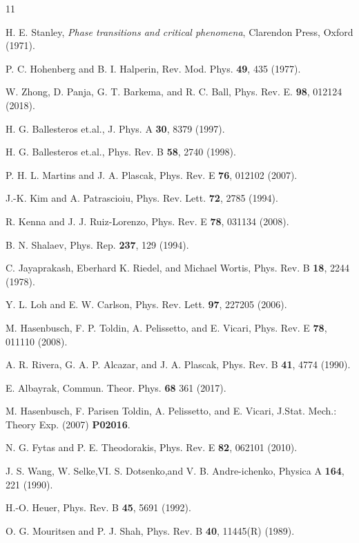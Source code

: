 \documentclass[12pt,nofootinbib,aps,amsmath,amssymb,preprint,showpacs]{revtex4}
\begin{document}
\begin{thebibliography}{11}

 H. E. Stanley, {\it Phase transitions and critical
  phenomena}, Clarendon Press, Oxford (1971).
  
 P. C. Hohenberg and B. I. Halperin,
  Rev. Mod. Phys. {\bf 49}, 435 (1977).

 W. Zhong, D. Panja, G. T. Barkema, and R. C. Ball,
  Phys. Rev. E. {\bf 98}, 012124 (2018).

 H. G. Ballesteros et.al., J. Phys. A {\bf 30}, 8379
  (1997).

 H. G. Ballesteros et.al., Phys. Rev. B {\bf 58}, 2740
  (1998).

 P. H. L. Martins and J. A. Plascak, Phys. Rev. E
  {\bf 76}, 012102 (2007).

 J.-K. Kim and A. Patrascioiu, Phys. Rev. Lett. {\bf 72},
  2785 (1994).

 R. Kenna and J. J. Ruiz-Lorenzo, Phys. Rev. E {\bf
  78}, 031134 (2008).

 B. N. Shalaev, Phys. Rep. {\bf 237}, 129 (1994).

 C. Jayaprakash, Eberhard K. Riedel, and Michael
  Wortis, Phys. Rev. B {\bf 18}, 2244 (1978).

 Y. L. Loh and E. W. Carlson, Phys. Rev. Lett. {\bf 97},
  227205 (2006).

 M. Hasenbusch, F. P. Toldin, A. Pelissetto, and
  E. Vicari, Phys. Rev. E {\bf 78}, 011110 (2008).

 A. R. Rivera, G. A. P. Alcazar, and J. A. Plascak,
  Phys. Rev. B {\bf 41}, 4774 (1990).

 E. Albayrak, Commun. Theor. Phys. {\bf 68} 361 (2017).

 M. Hasenbusch, F. Parisen Toldin, A. Pelissetto, and
  E. Vicari, J.Stat. Mech.: Theory Exp. (2007) {\bf P02016}.

 N. G. Fytas and P. E. Theodorakis, Phys. Rev. E {\bf
  82}, 062101 (2010).

 J. S. Wang, W. Selke,VI. S. Dotsenko,and
  V. B. Andre-ichenko, Physica A {\bf 164}, 221 (1990).

 H.-O. Heuer, Phys. Rev. B {\bf 45}, 5691 (1992).

 O. G. Mouritsen and P. J. Shah, Phys. Rev. B {\bf 40},
  11445(R) (1989).


\end{thebibliography}
\end{document}
